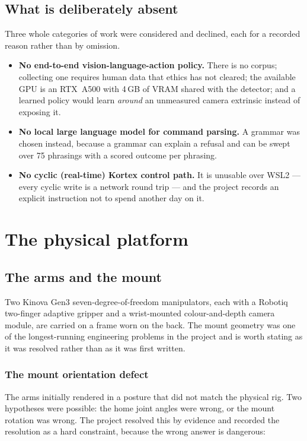 \documentclass[11pt,a4paper,oneside]{report}
\begin{document}
\section{What is deliberately absent}

Three whole categories of work were considered and declined, each for a
recorded reason rather than by omission.

\begin{itemize}
\item \textbf{No end-to-end vision-language-action policy.} There is no
      corpus; collecting one requires human data that ethics has not cleared;
      the available GPU is an RTX~A500 with 4\,GB of VRAM shared with the
      detector; and a learned policy would learn \emph{around} an unmeasured
      camera extrinsic instead of exposing it.
\item \textbf{No local large language model for command parsing.} A grammar
      was chosen instead, because a grammar can explain a refusal and can be
      swept over 75 phrasings with a scored outcome per phrasing.
\item \textbf{No cyclic (real-time) Kortex control path.} It is unusable over
      WSL2 --- every cyclic write is a network round trip --- and the project
      records an explicit instruction not to spend another day on it.
\end{itemize}

\chapter{The physical platform}

\section{The arms and the mount}

Two Kinova Gen3 seven-degree-of-freedom manipulators, each with a Robotiq
two-finger adaptive gripper and a wrist-mounted colour-and-depth camera module,
are carried on a frame worn on the back. The mount geometry was one of the
longest-running engineering problems in the project and is worth stating as it
was resolved rather than as it was first written.

\subsection{The mount orientation defect}

The arms initially rendered in a posture that did not match the physical rig.
Two hypotheses were possible: the home joint angles were wrong, or the mount
rotation was wrong. The project resolved this by evidence and recorded the
resolution as a hard constraint, because the wrong answer is dangerous:
\end{document}
